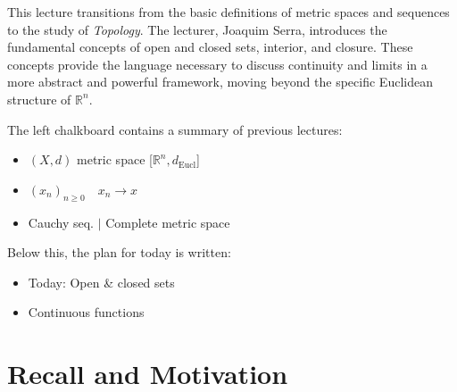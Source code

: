 
\begin{nice-box}[Context]
This lecture transitions from the basic definitions of metric spaces and sequences to the study of \emph{Topology}. The lecturer, Joaquim Serra, introduces the fundamental concepts of open and closed sets, interior, and closure. These concepts provide the language necessary to discuss continuity and limits in a more abstract and powerful framework, moving beyond the specific Euclidean structure of $\mathbb{R}^n$.
\end{nice-box}

\begin{meta-note}
The left chalkboard contains a summary of previous lectures:
\begin{itemize}
    \item $(X, d)$ metric space [$\mathbb{R}^n, d_{\text{Eucl}}$]
    \item $(x_n)_{n \ge 0} \quad x_n \to x$
    \item Cauchy seq. $\mid$ Complete metric space
\end{itemize}
Below this, the plan for today is written:
\begin{itemize}
    \item Today: Open \& closed sets
    \item Continuous functions
\end{itemize}
\end{meta-note}

\section{Recall and Motivation}


